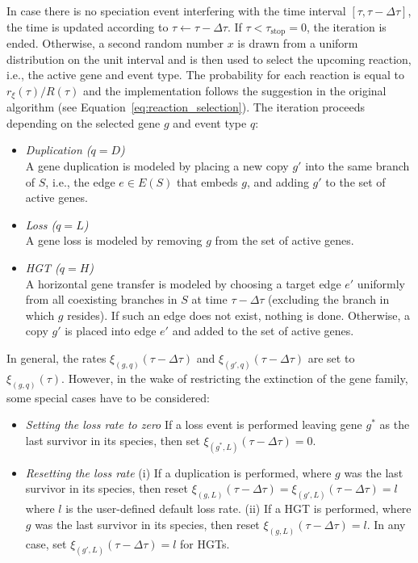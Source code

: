 \documentclass[hidelinks,11pt]{scrreprt}
\begin{document}
In case there is no speciation event interfering with the time interval $[\tau, \tau - \Delta\tau]$, the time is updated according to $\tau \leftarrow \tau - \Delta\tau$. If $\tau < \tau_{\textrm{stop}}=0$, the iteration is ended. Otherwise, a second random number $x$ is drawn from a uniform distribution on the unit interval and is then used to select the upcoming reaction, i.e., the active gene and event type.
The probability for each reaction is equal to $r_{\xi}(\tau)/R(\tau)$ and the implementation follows the suggestion in the original algorithm (see  Equation~\ref{eq:reaction_selection}). The iteration proceeds depending on the selected gene $g$ and event type $q$:
\begin{itemize}
	\item \textit{Duplication ($q=D$)\\}
	A gene duplication is modeled by placing a new copy $g'$ into the same branch of $S$, i.e., the edge $e \in E(S)$ that embeds $g$, and adding $g'$ to the set of active genes.
	\item \textit{Loss ($q=L$)\\}
	A gene loss is modeled by removing $g$ from the set of active genes.
	\item \textit{HGT ($q=H$)\\}
	A horizontal gene transfer is modeled by choosing a target edge $e'$ uniformly from all coexisting branches in $S$ at time $\tau - \Delta\tau$ (excluding the branch in which $g$ resides). If such an edge does not exist, nothing is done. Otherwise, a copy $g'$ is placed into edge $e'$ and added to the set of active genes.
\end{itemize}
In general, the rates $\xi_{(g,q)}(\tau - \Delta\tau)$ and $\xi_{(g',q)}(\tau - \Delta\tau)$ are set to $\xi_{(g,q)}(\tau)$. However, in the wake of restricting the extinction of the gene family, some special cases have to be considered:
\begin{itemize}
	\item \textit{Setting the loss rate to zero\newline}
	If a loss event is performed leaving gene $g^*$ as the last survivor in its species, then set $\xi_{(g^*,L)}(\tau - \Delta\tau) = 0$.
	\item \textit{Resetting the loss rate\newline}
	(i) If a duplication is performed, where $g$ was the last survivor in its species, then reset $\xi_{(g,L)}(\tau - \Delta\tau) = \xi_{(g',L)}(\tau - \Delta\tau) = l$ where $l$ is the user-defined default loss rate.\newline
	(ii) If a HGT is performed, where $g$ was the last survivor in its species, then reset $\xi_{(g,L)}(\tau - \Delta\tau) = l$. In any case, set $\xi_{(g',L)}(\tau - \Delta\tau) = l$ for HGTs.
\end{itemize}
\end{document}
